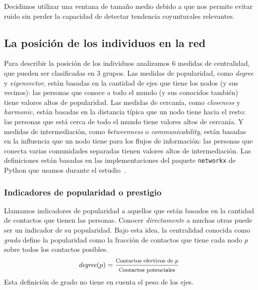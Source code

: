 \documentclass[a4paper,11pt]{book}
\theoremstyle{definition}
\begin{document}
Decidimos utilizar una ventana de tamaño medio debido a que nos permite evitar ruido sin perder la capacidad de detectar tendencia coyunturales relevantes.
\subsection{La posición de los individuos en la red}
Para describir la posición de los individuos analizamos 6 medidas de centralidad, que pueden ser clasificadas en 3 grupos.
%
Las medidas de popularidad, como \emph{degree} y \emph{eigenvector}, están basadas en la cantidad de ejes que tiene los nodos (y sus vecinos): las personas que conoce a todo el mundo (y sus conocidos también) tiene valores altos de popularidad.
%
Las medidas de cercanía, como \emph{closeness} y \emph{harmonic}, están basadas en la distancia típica que un nodo tiene hacia el resto: las personas que está cerca de todo el mundo tiene valores altos de cercanía.
%
Y medidas de intermediación, como \emph{betweenness} o \emph{communicability}, están basadas en la influencia que un nodo tiene para los flujos de información: las personas que conecta varias comunidades separadas tienen valores altos de intermediación.
%
Las definiciones están basadas en las implementaciones del paquete \texttt{networkx} de Python que usamos durante el estudio~\cite{hagberg2020-networkx}.
\subsubsection{Indicadores de popularidad o prestigio}
Llamamos indicadores de popularidad a aquellos que están basados en la cantidad de contactos que tienen las personas.
%
Conocer \emph{directamente} a muchas otras puede ser un indicador de su popularidad.
%
Bajo esta idea, la centralidad conocida como \emph{grado} define la popularidad como la fracción de contactos que tiene cada nodo $p$ sobre todos los contactos posibles.
%
\begin{equation}
\emph{degree}(p) = \footnotesize \frac{\text{Contactos efectivos de $p$}}{\text{Contactos potenciales}}
\end{equation}
%
Esta definición de grado no tiene en cuenta el peso de los ejes.
\end{document}
